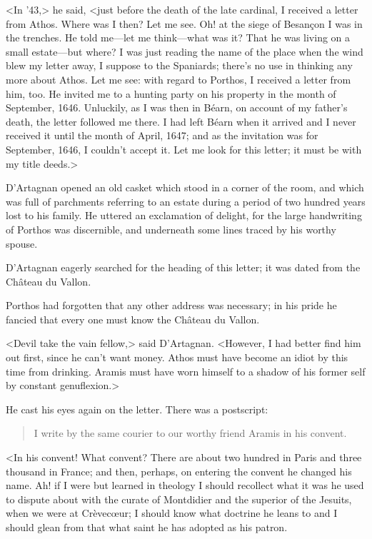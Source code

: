 <In '43,> he said, <just before the death of the late cardinal, I received a letter from Athos. Where was I then? Let me see. Oh! at the siege of Besançon I was in the trenches. He told me—let me think—what was it? That he was living on a small estate—but where? I was just reading the name of the place when the wind blew my letter away, I suppose to the Spaniards; there's no use in thinking any more about Athos. Let me see: with regard to Porthos, I received a letter from him, too. He invited me to a hunting party on his property in the month of September, 1646. Unluckily, as I was then in Béarn, on account of my father's death, the letter followed me there. I had left Béarn when it arrived and I never received it until the month of April, 1647; and as the invitation was for September, 1646, I couldn't accept it. Let me look for this letter; it must be with my title deeds.>

D'Artagnan opened an old casket which stood in a corner of the room, and which was full of parchments referring to an estate during a period of two hundred years lost to his family. He uttered an exclamation of delight, for the large handwriting of Porthos was discernible, and underneath some lines traced by his worthy spouse.

D'Artagnan eagerly searched for the heading of this letter; it was dated from the Château du Vallon.

Porthos had forgotten that any other address was necessary; in his pride he fancied that every one must know the Château du Vallon.

<Devil take the vain fellow,> said D'Artagnan. <However, I had better find him out first, since he can't want money. Athos must have become an idiot by this time from drinking. Aramis must have worn himself to a shadow of his former self by constant genuflexion.>

He cast his eyes again on the letter. There was a postscript:  
\begin{quote}
I write by the same courier to our worthy friend Aramis in his convent.
\end{quote}

<In his convent! What convent? There are about two hundred in Paris and three thousand in France; and then, perhaps, on entering the convent he changed his name. Ah! if I were but learned in theology I should recollect what it was he used to dispute about with the curate of Montdidier and the superior of the Jesuits, when we were at Crèvecœur; I should know what doctrine he leans to and I should glean from that what saint he has adopted as his patron.

